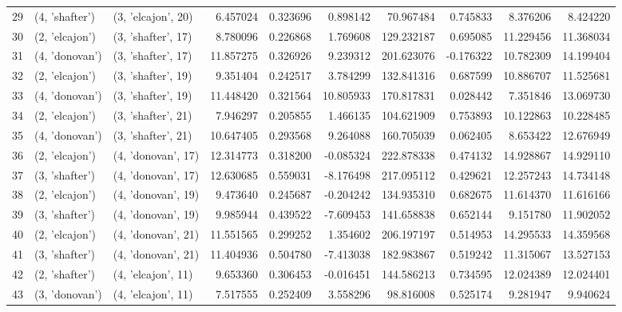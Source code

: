 \begin{tabular}{lllrrrrrrr}
29 &   (4, 'shafter') &  (3, 'elcajon', 20) &   6.457024 &  0.323696 &   0.898142 &   70.967484 &  0.745833 &   8.376206 &   8.424220 \\
30 &   (2, 'elcajon') &  (3, 'shafter', 17) &   8.780096 &  0.226868 &   1.769608 &  129.232187 &  0.695085 &  11.229456 &  11.368034 \\
31 &   (4, 'donovan') &  (3, 'shafter', 17) &  11.857275 &  0.326926 &   9.239312 &  201.623076 & -0.176322 &  10.782309 &  14.199404 \\
32 &   (2, 'elcajon') &  (3, 'shafter', 19) &   9.351404 &  0.242517 &   3.784299 &  132.841316 &  0.687599 &  10.886707 &  11.525681 \\
33 &   (4, 'donovan') &  (3, 'shafter', 19) &  11.448420 &  0.321564 &  10.805933 &  170.817831 &  0.028442 &   7.351846 &  13.069730 \\
34 &   (2, 'elcajon') &  (3, 'shafter', 21) &   7.946297 &  0.205855 &   1.466135 &  104.621909 &  0.753893 &  10.122863 &  10.228485 \\
35 &   (4, 'donovan') &  (3, 'shafter', 21) &  10.647405 &  0.293568 &   9.264088 &  160.705039 &  0.062405 &   8.653422 &  12.676949 \\
36 &   (2, 'elcajon') &  (4, 'donovan', 17) &  12.314773 &  0.318200 &  -0.085324 &  222.878338 &  0.474132 &  14.928867 &  14.929110 \\
37 &   (3, 'shafter') &  (4, 'donovan', 17) &  12.630685 &  0.559031 &  -8.176498 &  217.095112 &  0.429621 &  12.257243 &  14.734148 \\
38 &   (2, 'elcajon') &  (4, 'donovan', 19) &   9.473640 &  0.245687 &  -0.204242 &  134.935310 &  0.682675 &  11.614370 &  11.616166 \\
39 &   (3, 'shafter') &  (4, 'donovan', 19) &   9.985944 &  0.439522 &  -7.609453 &  141.658838 &  0.652144 &   9.151780 &  11.902052 \\
40 &   (2, 'elcajon') &  (4, 'donovan', 21) &  11.551565 &  0.299252 &   1.354602 &  206.197197 &  0.514953 &  14.295533 &  14.359568 \\
41 &   (3, 'shafter') &  (4, 'donovan', 21) &  11.404936 &  0.504780 &  -7.413038 &  182.983867 &  0.519242 &  11.315067 &  13.527153 \\
42 &   (2, 'shafter') &  (4, 'elcajon', 11) &   9.653360 &  0.306453 &  -0.016451 &  144.586213 &  0.734595 &  12.024389 &  12.024401 \\
43 &   (3, 'donovan') &  (4, 'elcajon', 11) &   7.517555 &  0.252409 &   3.558296 &   98.816008 &  0.525174 &   9.281947 &   9.940624 \\

\end{tabular}
